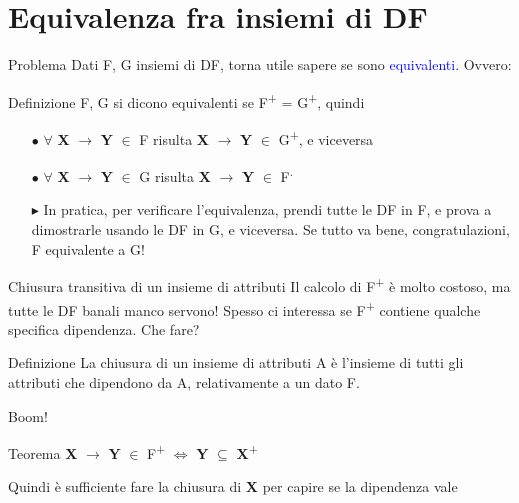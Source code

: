 \documentclass{beamer}
\begin{document}
\section{Equivalenza fra insiemi di DF}
\begin{frame}{Problema}
    Dati F, G insiemi di DF, torna utile sapere se sono \textcolor{blue}{equivalenti}. Ovvero:
    \begin{block}{Definizione}
        F, G si dicono equivalenti se F\textsuperscript{+} = G\textsuperscript{+}, quindi 
        
        \begin{itemize}
            \item[$\bullet$] $\forall$ \textbf{X} $\rightarrow$ \textbf{Y} $\in$ F risulta \textbf{X} $\rightarrow$ \textbf{Y} $\in$ G\textsuperscript{+}, e viceversa
            \item[$\bullet$] $\forall$ \textbf{X} $\rightarrow$ \textbf{Y} $\in$ G risulta \textbf{X} $\rightarrow$ \textbf{Y} $\in$ F\textsuperscript.
        \end{itemize}
        
    \end{block}
    
    \vfill
    \begin{itemize}
        \item[$\blacktriangleright$] In pratica, per verificare l'equivalenza, prendi tutte le DF in F, e prova a dimostrarle usando le DF in G, e viceversa. Se tutto va bene, congratulazioni, F equivalente a G!
    \end{itemize}
    
    
\end{frame}

\begin{frame}{Chiusura transitiva di un insieme di attributi}
    Il calcolo di F\textsuperscript{+} è molto costoso, ma tutte le DF banali manco servono! Spesso ci interessa se F\textsuperscript{+} contiene qualche specifica dipendenza. Che fare?
    \begin{block}{Definizione}
    La chiusura di un insieme di attributi A è l'insieme di tutti gli attributi che dipendono da A, relativamente a un dato F.
    \end{block}
    
    \vfill
    Boom!
    \begin{alertblock}{Teorema}
        \centering
        \textbf{X} $\rightarrow$ \textbf{Y} $\in$ F\textsuperscript{+} $\iff$ \textbf{Y} $\subseteq$ \textbf{X}\textsuperscript{+}
    \end{alertblock}
    Quindi è sufficiente fare la chiusura di \textbf{X} per capire se la dipendenza vale
\end{frame}
\end{document}
